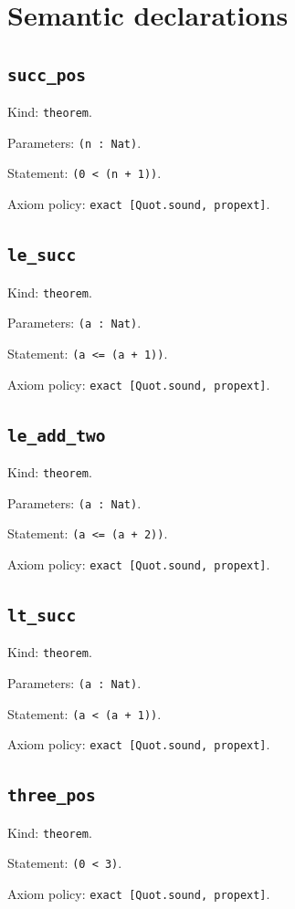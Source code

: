 \documentclass[11pt]{article}
\begin{document}
\section*{Semantic declarations}
\subsection*{\texttt{succ\_pos}}
\noindent Kind: \texttt{theorem}.\par
\noindent Parameters: \texttt{(n : Nat)}.\par
\noindent Statement: \texttt{(0 < (n + 1))}.\par
\noindent Axiom policy: \texttt{exact [Quot.sound, propext]}.\par
\subsection*{\texttt{le\_succ}}
\noindent Kind: \texttt{theorem}.\par
\noindent Parameters: \texttt{(a : Nat)}.\par
\noindent Statement: \texttt{(a <= (a + 1))}.\par
\noindent Axiom policy: \texttt{exact [Quot.sound, propext]}.\par
\subsection*{\texttt{le\_add\_two}}
\noindent Kind: \texttt{theorem}.\par
\noindent Parameters: \texttt{(a : Nat)}.\par
\noindent Statement: \texttt{(a <= (a + 2))}.\par
\noindent Axiom policy: \texttt{exact [Quot.sound, propext]}.\par
\subsection*{\texttt{lt\_succ}}
\noindent Kind: \texttt{theorem}.\par
\noindent Parameters: \texttt{(a : Nat)}.\par
\noindent Statement: \texttt{(a < (a + 1))}.\par
\noindent Axiom policy: \texttt{exact [Quot.sound, propext]}.\par
\subsection*{\texttt{three\_pos}}
\noindent Kind: \texttt{theorem}.\par
\noindent Statement: \texttt{(0 < 3)}.\par
\noindent Axiom policy: \texttt{exact [Quot.sound, propext]}.\par
\end{document}
